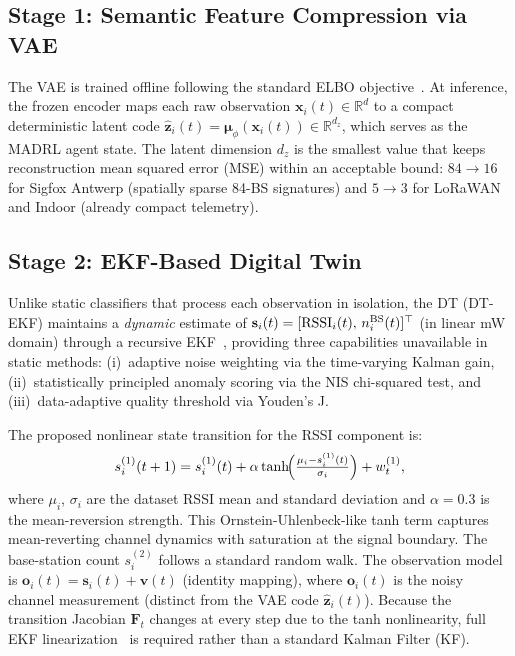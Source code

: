 \documentclass[conference]{IEEEtran}
\begin{document}
\subsection{Stage 1: Semantic Feature Compression via VAE}

The VAE is trained offline following the standard ELBO
objective~\cite{ref_vae}. At inference, the frozen encoder maps each
raw observation $\mathbf{x}_i(t)\in\mathbb{R}^d$ to a compact
deterministic latent code
$\hat{\mathbf{z}}_i(t)=\bm{\mu}_\phi(\mathbf{x}_i(t))\in\mathbb{R}^{d_z}$,
which serves as the MADRL agent state. The latent dimension $d_z$ is
the smallest value that keeps reconstruction mean squared error (MSE) within an acceptable
bound: $84\to16$ for Sigfox Antwerp (spatially sparse 84-BS signatures)
and $5\to3$ for LoRaWAN and Indoor (already compact telemetry).

\subsection{Stage 2: EKF-Based Digital Twin}
\label{sec:dt}

Unlike static classifiers that process each observation in isolation,
the DT (DT-EKF) maintains a \textit{dynamic} estimate of
$\mathbf{s}_i(t)=[{\rm RSSI}_i(t),\,n^{\rm BS}_i(t)]^\top$
(in linear mW domain) through a recursive EKF~\cite{ref_ekf},
providing three capabilities unavailable in static methods:
(i)~adaptive noise weighting via the time-varying Kalman gain,
(ii)~statistically principled anomaly scoring via the NIS chi-squared test,
and (iii)~data-adaptive quality threshold via Youden's J.

The proposed nonlinear state transition for the RSSI component is:
\begin{equation}
s^{(1)}_i(t+1) = s^{(1)}_i(t)
  + \alpha\tanh\!\Bigl(\tfrac{\mu_i - s^{(1)}_i(t)}{\sigma_i}\Bigr)
  + w^{(1)}_t,
\label{eq:ss1}
\end{equation}
where $\mu_i$, $\sigma_i$ are the dataset RSSI mean and standard deviation
and $\alpha{=}0.3$ is the mean-reversion strength. This
Ornstein-Uhlenbeck-like tanh term captures mean-reverting channel dynamics
with saturation at the signal boundary. The base-station count
$s^{(2)}_i$ follows a standard random walk. The observation model is
$\mathbf{o}_i(t)=\mathbf{s}_i(t)+\mathbf{v}(t)$ (identity mapping),
where $\mathbf{o}_i(t)$ is the noisy channel measurement (distinct from
the VAE code $\hat{\mathbf{z}}_i(t)$). Because the transition Jacobian
$\mathbf{F}_t$ changes at every step due to the tanh nonlinearity, full
EKF linearization~\cite{ref_ekf} is required rather than a standard Kalman Filter (KF).
\end{document}
